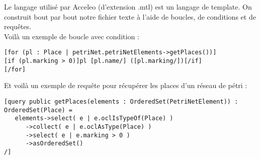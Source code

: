 Le langage utilisé par Acceleo (d'extension .mtl) est un langage de template.
On construit bout par bout notre fichier texte à l'aide de boucles, de conditions et de requêtes.\\

Voilà un exemple de boucle avec condition :
\begin{lstlisting}
[for (pl : Place | petriNet.petriNetElements->getPlaces())]
[if (pl.marking > 0)]pl [pl.name/] ([pl.marking/])[/if]
[/for]
\end{lstlisting}

Et voilà un exemple de requête pour récupérer les places d'un réseau de pétri :
\begin{lstlisting}
[query public getPlaces(elements : OrderedSet(PetriNetElement)) : OrderedSet(Place) = 
   elements->select( e | e.oclIsTypeOf(Place) )
      ->collect( e | e.oclAsType(Place) )
      ->select( e | e.marking > 0 )
      ->asOrderedSet()
/]
\end{lstlisting}

